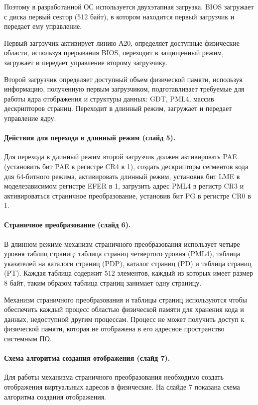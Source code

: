 \documentclass[12pt]{article}
\begin{document}
Поэтому в разработанной ОС используется двухэтапная загрузка. BIOS загружает с диска
первый сектор (512 байт), в котором находится первый загрузчик и передает ему управление.

Первый загрзучик активирует линию А20, определяет доступные физические области, используя
прерывания BIOS, переходит в защищенный режим, загружает и передает управление второму
загрузчику.

Второй загрузчик определяет доступный объем физической памяти, используя информацию, полученную
первым загрузчиком, подготавливает требуемые для работы ядра отображения и структуры данных:
GDT, PML4, массив дескрипторов страниц. Переходит в длинный режим, загружает и передает
управление ядру.

\paragraph{Действия для перехода в длинный режим (слайд 5).}
Для перехода в длинный режим второй загрузчик должен активировать PAE (установить бит PAE в регистре
CR4 в 1), создать дескрипторы сегментов кода для 64-битного режима, активировать длинный режим,
установив бит LME в моделезависимом регистре EFER в 1, загрузить адрес PML4 в регистр CR3 и
активироваться страничное преобразование, установив бит PG в регистре CR0 в 1.

\paragraph{Страничное преобразование (слайд 6).}
В длинном режиме механизм страничного преобразования использует четыре уровня таблиц страниц:
таблица страниц четвертого уровня (PML4), таблица указателей на каталоги страниц (PDP),
каталог страниц (PD) и таблица страниц (PT). Каждая таблица содержит 512 элементов, каждый из
которых имеет размер 8 байт, таким образом таблица страниц занимает одну страницу.

Механизм страничного преобразования и таблицы страниц используются чтобы обеспечить
каждый процесс областью физической памяти для хранения кода и данных, недоступной другим процессам.
Процесс не может получить доступ к физической памяти, которая не отображена в его адресное
пространство системным ПО.

\paragraph{Схема алгоритма создания отображения (слайд 7).}
Для работы механизма страничного преобразования необходимо создать отображения виртуальных адресов в
физические. На слайде 7 показана схема алгоритма создания отображения.
\end{document}
